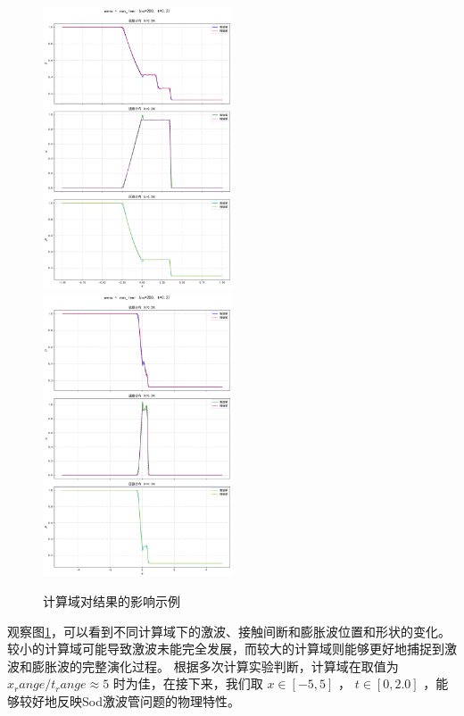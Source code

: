 \documentclass[UTF8]{ctexart}
\begin{document}
\begin{figure}
    \includegraphics[width=0.5\textwidth]{1-02.png}
    \includegraphics[width=0.5\textwidth]{5-02.png}
    \caption{计算域对结果的影响示例}
    \label{fig:domain_effect}
\end{figure}
观察图\ref{fig:domain_effect}，可以看到不同计算域下的激波、接触间断和膨胀波位置和形状的变化。较小的计算域可能导致激波未能完全发展，而较大的计算域则能够更好地捕捉到激波和膨胀波的完整演化过程。
根据多次计算实验判断，计算域在取值为$ x_range / t_range \approx 5$ 时为佳，在接下来，我们取 $x \in [-5, 5]$ ， $t \in [0, 2.0]$ ，能够较好地反映Sod激波管问题的物理特性。
\end{document}
